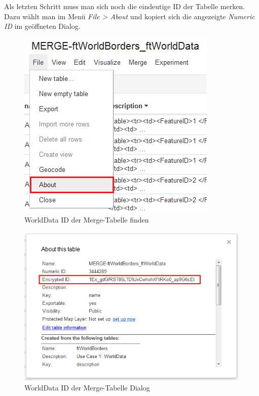 Als letzten Schritt muss man sich noch die eindeutige ID der Tabelle merken. Dazu wählt man im Menü  \emph{File > About} und kopiert sich die angezeigte \emph{Numeric ID} im geöffneten Dialog.

\begin{figure}[htbp]
	\centering
	\includegraphics{images/usecase1-worlddata/worlddata-prepare_fusiontableslayer3.png}
	\caption{WorldData ID der Merge-Tabelle finden}
	\label{worlddata-prepare_fusiontableslayer3.png}
\end{figure}

\begin{figure}[htbp]
	\centering
	\includegraphics{images/usecase1-worlddata/worlddata-prepare_fusiontableslayer4.png}
	\caption{WorldData ID der Merge-Tabelle Dialog}
	\label{worlddata-prepare_fusiontableslayer4.png}
\end{figure}

